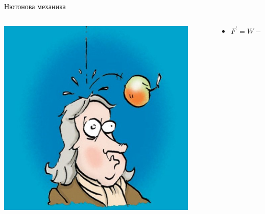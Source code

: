 \documentclass[10pt,a4paper]{beamer}
\begin{document}
        \begin{frame}{ Нютонова механика }
            \begin{columns}
                \begin{column}{0.5\textwidth}
                    \includegraphics[width=0.9\textwidth]{images/newton_apple.jpg}
                \end{column}
                \begin{column}{0.5\textwidth}
                    \begin{itemize}
                        \item $ F^{\prime} = W - F_{drag} $
                    \end{itemize}
                \end{column}
            \end{columns}
        \end{frame}
        
\end{document}
